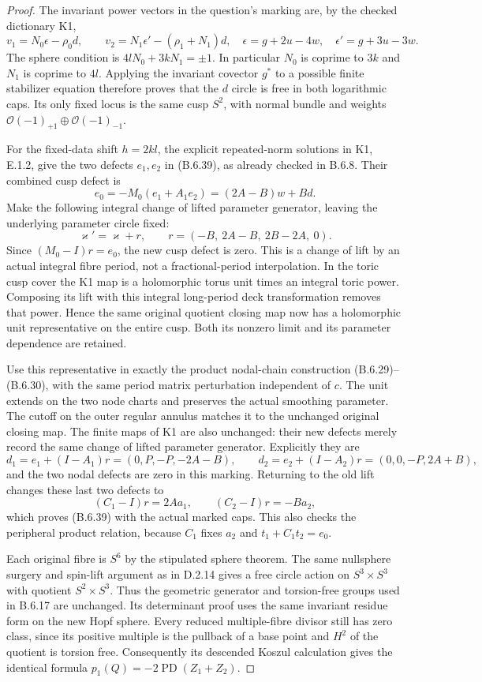 \begin{proof}
The invariant power vectors in the question's marking are,
by the checked dictionary K1,
\[
 v_1=N_0\epsilon-\rho_0d,\qquad
 v_2=N_1\epsilon'-(\rho_1+N_1)d,
\quad \epsilon=g+2u-4w,\quad\epsilon'=g+3u-3w.
\]
The sphere condition is $4lN_0+3kN_1=\pm1$.  In particular
$N_0$ is coprime to $3k$ and $N_1$ is coprime to $4l$.
Applying the invariant covector $g^*$ to a possible finite
stabilizer equation therefore proves that the $d$ circle
is free in both logarithmic caps.  Its only fixed locus
is the same cusp $S^2$, with normal bundle and weights
$\mathcal O(-1)_{+1}\oplus\mathcal O(-1)_{-1}$.

For the fixed-data shift $h=2kl$, the explicit repeated-norm
solutions in K1, E.1.2, give the two defects $e_1,e_2$
in (B.6.39), as already checked in B.6.8.  Their combined
cusp defect is
\[
 e_0=-M_0(e_1+A_1e_2)=(2A-B)w+Bd.
\]
Make the following integral change of lifted parameter
generator, leaving the underlying parameter circle fixed:
\[
 \varkappa' =\varkappa+r,
 \qquad r=(-B,\ 2A-B,\ 2B-2A,\ 0).
 \tag{B.6.41}
\]
Since $(M_0-I)r=e_0$, the new cusp defect is zero.
This is a change of lift by an actual integral fibre
period, not a fractional-period interpolation.  In the
toric cusp cover the K1 map is a holomorphic torus unit
times an integral toric power.  Composing its lift with
this integral long-period deck transformation removes
that power.  Hence the same original quotient closing
map now has a holomorphic unit representative on the
entire cusp.  Both its nonzero limit and its parameter
dependence are retained.

Use this representative in exactly the product nodal-chain
construction (B.6.29)--(B.6.30), with the same period
matrix perturbation independent of $c$.  The unit extends
on the two node charts and preserves the actual smoothing
parameter.  The cutoff on the outer regular annulus
matches it to the unchanged original closing map.
The finite maps of K1 are also unchanged: their new
defects merely record the same change of lifted
parameter generator.  Explicitly they are
\[
 d_1=e_1+(I-A_1)r=(0,P,-P,-2A-B),\qquad
 d_2=e_2+(I-A_2)r=(0,0,-P,2A+B),
 \tag{B.6.42}
\]
and the two nodal defects are zero in this marking.
Returning to the old lift changes these last two
defects to
\[
 (C_1-I)r=2Aa_1,\qquad (C_2-I)r=-Ba_2,
\]
which proves (B.6.39) with the actual marked caps.
This also checks the peripheral product relation,
because $C_1$ fixes $a_2$ and $t_1+C_1t_2=e_0$.

Each original fibre is $S^6$ by the stipulated sphere
theorem.  The same nullsphere surgery and spin-lift
argument as in D.2.14 gives a free circle action on
$S^3\times S^3$ with quotient $S^2\times S^3$.
Thus the geometric generator and torsion-free groups
used in B.6.17 are unchanged.  Its determinant proof
uses the same invariant residue form on the new Hopf
sphere.  Every reduced multiple-fibre divisor still
has zero class, since its positive multiple is the
pullback of a base point and $H^2$ of the quotient
is torsion free.  Consequently its descended Koszul
calculation gives the identical formula
$p_1(Q)=-2\operatorname{PD}(Z_1+Z_2)$.


\end{proof}
